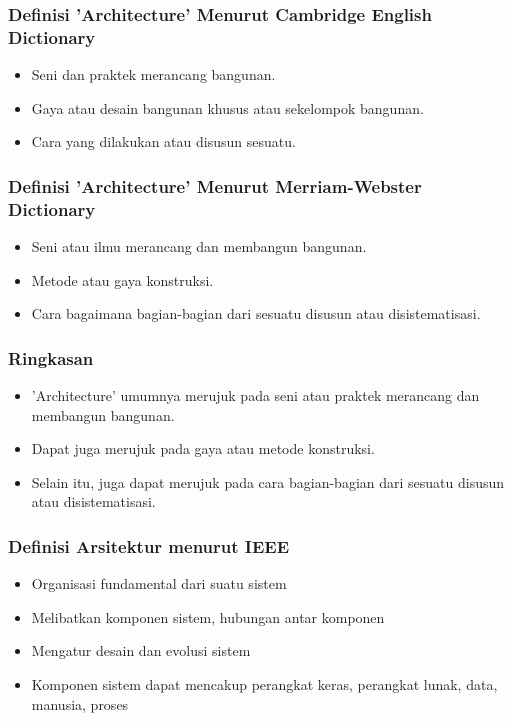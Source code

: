 \documentclass{beamer}
\begin{document}
	\begin{frame}
		\frametitle{Definisi 'Architecture' Menurut Cambridge English Dictionary}
		\begin{itemize}
			\item Seni dan praktek merancang bangunan.
			\item Gaya atau desain bangunan khusus atau sekelompok bangunan.
			\item Cara yang dilakukan atau disusun sesuatu.
		\end{itemize}
	\end{frame}
	
	\begin{frame}
		\frametitle{Definisi 'Architecture' Menurut Merriam-Webster Dictionary}
		\begin{itemize}
			\item Seni atau ilmu merancang dan membangun bangunan.
			\item Metode atau gaya konstruksi.
			\item Cara bagaimana bagian-bagian dari sesuatu disusun atau disistematisasi.
		\end{itemize}
	\end{frame}
	
	\begin{frame}
		\frametitle{Ringkasan}
		\begin{itemize}
			\item 'Architecture' umumnya merujuk pada seni atau praktek merancang dan membangun bangunan.
			\item Dapat juga merujuk pada gaya atau metode konstruksi.
			\item Selain itu, juga dapat merujuk pada cara bagian-bagian dari sesuatu disusun atau disistematisasi.
		\end{itemize}
	\end{frame}
	
	\begin{frame}
		\frametitle{Definisi Arsitektur menurut IEEE}
		\begin{itemize}
			\item Organisasi fundamental dari suatu sistem
			\item Melibatkan komponen sistem, hubungan antar komponen
			\item Mengatur desain dan evolusi sistem
			\item Komponen sistem dapat mencakup perangkat keras, perangkat lunak, data, manusia, proses
		\end{itemize}
	\end{frame}
	
\end{document}

